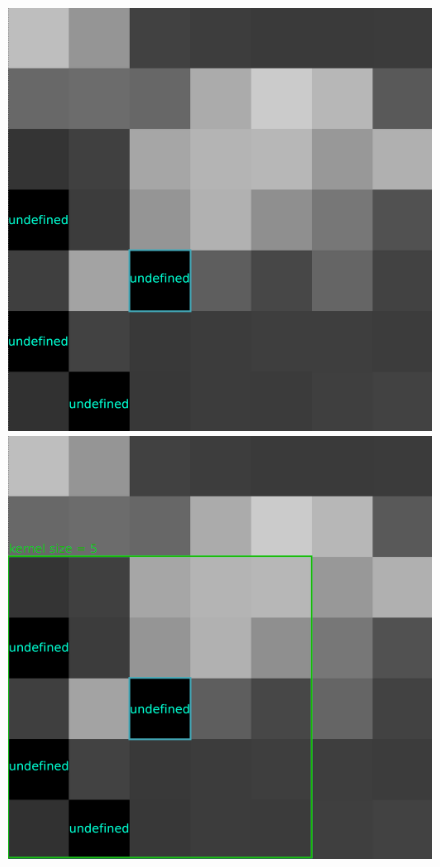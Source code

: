 \documentclass[12pt, a4paper]{report}
\begin{document}
	\begin{figure}[h!]
	\centering
	\begin{minipage}{0.44\textwidth}
		\centering
		\includegraphics[width=\linewidth]{../images/gaussian_image.png}
	\end{minipage}
	\begin{minipage}{0.44\textwidth}
		\centering
		\includegraphics[width=\linewidth]{../images/gaussian_kernel1.png}

\end{minipage}
\end{figure}
\end{document}
